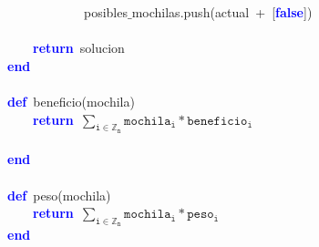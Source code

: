 \mbox{}\ \ \ \ \ \ \ \ \ \ \ \ posibles$\_$mochilas\textcolor{BrickRed}{.}push\textcolor{BrickRed}{(}actual\ \textcolor{BrickRed}{+}\ \textcolor{BrickRed}{[}\textbf{\textcolor{Blue}{false}}\textcolor{BrickRed}{])} \\
\mbox{} \\
\mbox{}\ \ \ \ \textbf{\textcolor{Blue}{return}}\ solucion \\
\mbox{}\textbf{\textcolor{Blue}{end}} \\
\mbox{} \\
\mbox{}\textbf{\textcolor{Blue}{def}}\ beneficio\textcolor{BrickRed}{(}mochila\textcolor{BrickRed}{)} \\
\mbox{}\ \ \ \ \textbf{\textcolor{Blue}{return}}\ $\mathtt{\sum_{i \in \mathbb{Z}_n} mochila_i * beneficio_i}$ \\ \\
\mbox{}\textbf{\textcolor{Blue}{end}} \\
\mbox{} \\
\mbox{}\textbf{\textcolor{Blue}{def}}\ peso\textcolor{BrickRed}{(}mochila\textcolor{BrickRed}{)} \\
\mbox{}\ \ \ \ \textbf{\textcolor{Blue}{return}}\ $\mathtt{\sum_{i \in \mathbb{Z}_n} mochila_i * peso_i}$ \\
\mbox{}\textbf{\textcolor{Blue}{end}} \\
\mbox{} \\
\mbox{}\ \ \ \ \ \ \ \ \ \ \ \  \\
\mbox{}
